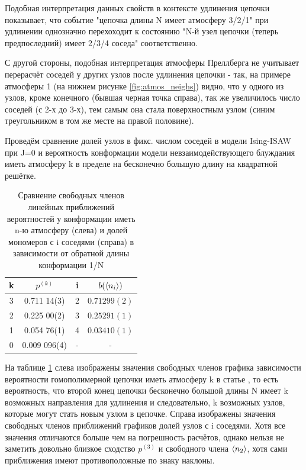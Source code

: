 Подобная интерпретация данных свойств в контексте удлинения цепочки показывает, что событие "цепочка длины N имеет атмосферу 3/2/1" при удлинении однозначно перехоходит к состоянию "N-й узел цепочки (теперь предпоследний) имеет 2/3/4 соседа" соответственно.

С другой стороны, подобная интерпретация атмосферы Преллберга не учитывает перерасчёт соседей у других узлов после удлинения цепочки - так, на примере атмосферы 1 (на нижнем рисунке \ref{fig:atmos_neighs}) видно, что у одного из узлов, кроме конечного (бывшая черная точка справа), так же увеличилось число соседей (с 2-х до 3-х), тем самым она стала поверхностным узлом (синим треугольником в том же месте на правой половине).

Проведём сравнение долей узлов в фикс. числом соседей в модели Ising-ISAW при J=0 и вероятность конформации модели невзаимодействующего блуждания иметь атмосферу k в пределе на бесконечно большую длину на квадратной решётке. 

\begin{table}[h]
    \centering
    \begin{tabular}{|c|c|c|c|}
    \hline
    k & $p^{(k)}$ & i & $b(\langle n_{i} \rangle)$ \\ \hline
    3 & 0.711 14(3) & 2 & $0.71299(2)$ \\ \hline
    2 & 0.225 00(2) & 3 & $0.25291(1)$ \\ \hline
    1 & 0.054 76(1) & 4 & $0.03410(1)$\\ \hline
    0 & 0.009 096(4) & - & - \\ \hline
    \end{tabular}
    \caption{Сравнение свободных членов линейных приближений вероятностей у конформации иметь n-ю атмосферу (слева) и долей мономеров с i соседями (справа) в зависимости от обратной длины конформации 1/N}
    \label{tab:Prellb_Compare}
\end{table}

На таблице \ref{tab:Prellb_Compare} слева изображены значения свободных членов графика зависимости вероятности гомополимерной цепочки иметь атмосферу k в статье \cite{owczarek2008scaling}, то есть вероятность, что второй конец цепочки бесконечно большой длины N имеет k возможных направления для удлинения и следовательно, k возможных узлов, которые могут стать новым узлом в цепочке. Справа изображены значения свободных членов приближений графиков долей узлов с i соседями. Хотя все значения отличаются больше чем на погрешность расчётов, однако нельзя не заметить довольно близкое сходство $p^{(3)}$ и свободного члена $\langle n_{2} \rangle$, хотя сами приближения имеют противоположные по знаку наклоны. 

